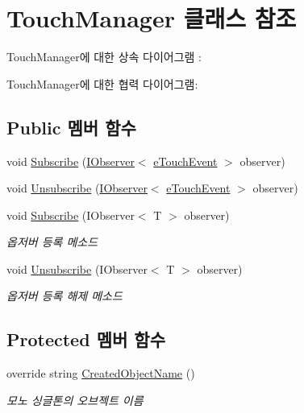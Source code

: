 \hypertarget{class_touch_manager}{}\section{Touch\+Manager 클래스 참조}
\label{class_touch_manager}


Touch\+Manager에 대한 상속 다이어그램 \+: 


Touch\+Manager에 대한 협력 다이어그램\+:
\subsection*{Public 멤버 함수}
\begin{DoxyCompactItemize}
\item 
void \hyperlink{class_touch_manager_aa68342b07f75f8eda3b420e07f9e4c7b}{Subscribe} (\hyperlink{interface_f_z_1_1_i_observer}{I\+Observer}$<$ \hyperlink{_touch_manager_8cs_ae33e321a424fe84ba8b2fdb81ad40a68}{e\+Touch\+Event} $>$ observer)
\item 
void \hyperlink{class_touch_manager_a2c4ace4b27bef64c2e9496240ee4d676}{Unsubscribe} (\hyperlink{interface_f_z_1_1_i_observer}{I\+Observer}$<$ \hyperlink{_touch_manager_8cs_ae33e321a424fe84ba8b2fdb81ad40a68}{e\+Touch\+Event} $>$ observer)
\item 
void \hyperlink{interface_f_z_1_1_i_observable_a9d81fb0fd7c697a9e78cf0ac8ce4d233}{Subscribe} (I\+Observer$<$ T $>$ observer)
\begin{DoxyCompactList}\small\item\em 옵저버 등록 메소드 \end{DoxyCompactList}\item 
void \hyperlink{interface_f_z_1_1_i_observable_a52b72c2bdfb0fe164945d7fe74cec386}{Unsubscribe} (I\+Observer$<$ T $>$ observer)
\begin{DoxyCompactList}\small\item\em 옵저버 등록 해제 메소드 \end{DoxyCompactList}\end{DoxyCompactItemize}
\subsection*{Protected 멤버 함수}
\begin{DoxyCompactItemize}
\item 
override string \hyperlink{class_touch_manager_a8fb5460d8904a0c1a6453b5c49dc3cb4}{Created\+Object\+Name} ()
\begin{DoxyCompactList}\small\item\em 모노 싱글톤의 오브젝트 이름 \end{DoxyCompactList}\end{DoxyCompactItemize}
